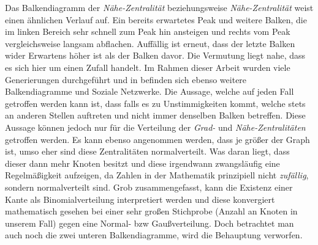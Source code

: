 Das Balkendiagramm der \textit{Nähe-Zentralität} beziehungsweise \textit{Nähe-Zentralität} weist einen ähnlichen Verlauf auf. Ein bereits erwartetes Peak und weitere Balken, die im linken Bereich sehr schnell zum Peak hin ansteigen und rechts vom Peak vergleichsweise langsam abflachen. Auffällig ist erneut, dass der letzte Balken wider Erwartens höher ist als der Balken davor. Die Vermutung liegt nahe, dass es sich hier um einen Zufall handelt. Im Rahmen dieser Arbeit wurden viele Generierungen durchgeführt und in \cite{TZ} befinden sich ebenso weitere Balkendiagramme und Soziale Netzwerke. Die Aussage, welche auf jeden Fall getroffen werden kann ist, dass falls es zu Unstimmigkeiten kommt, welche stets an anderen Stellen auftreten und nicht immer denselben Balken betreffen. Diese Aussage können jedoch nur für die Verteilung der \textit{Grad-} und \textit{Nähe-Zentralitäten} getroffen werden. Es kann ebenso angenommen werden, dass je größer der Graph ist, umso eher sind diese Zentralitäten normalverteilt. Was daran liegt, dass dieser dann mehr Knoten besitzt und diese irgendwann zwangsläufig eine Regelmäßigkeit aufzeigen, da Zahlen in der Mathematik prinzipiell nicht \textit{zufällig}, sondern normalverteilt sind. Grob zusammengefasst, kann die Existenz einer Kante als Binomialverteilung interpretiert werden und diese konvergiert mathematisch gesehen bei einer sehr großen Stichprobe (Anzahl an Knoten in unserem Fall) gegen eine Normal- bzw Gaußverteilung.
Doch betrachtet man auch noch die zwei unteren Balkendiagramme, wird die Behauptung verworfen. \\

